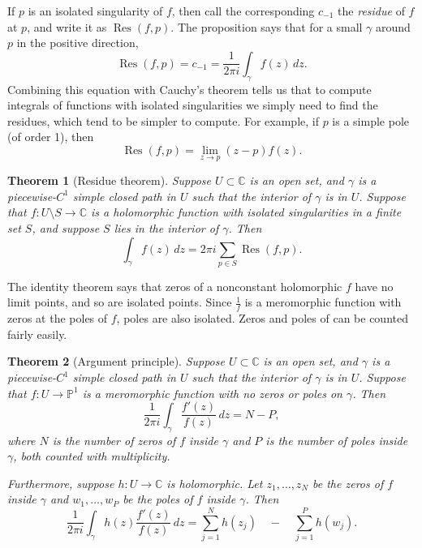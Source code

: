 \documentclass[12pt,openany]{book}
\newcommand{\C}{{\mathbb{C}}}
\newcommand{\bP}{{\mathbb{P}}}
\newcommand{\myindex}[1]{#1\index{#1}}
\theoremstyle{plain}
\newtheorem{thm}{Theorem}[section]
\theoremstyle{remark}
\theoremstyle{definition}
\theoremstyle{exercise}
\theoremstyle{example}
\begin{document}
\pagebreak[3]
If $p$ is an isolated singularity of $f$, then call the corresponding
$c_{-1}$ the \emph{\myindex{residue}} of $f$ at $p$, and write it
as $\operatorname{Res}(f,p)$.  
The proposition says that for a small $\gamma$ around $p$ in the positive direction,
\begin{equation*}
\operatorname{Res}(f,p) = c_{-1} = \frac{1}{2\pi i} \int_\gamma f(z) \, dz
.
\end{equation*}
Combining this equation with Cauchy's theorem tells us that to compute
integrals of functions with isolated singularities we simply need to find
the residues,
which tend to be simpler to
compute.  For example, if $p$ is a simple pole (of order 1), then 
\begin{equation*}
\operatorname{Res}(f,p) = \lim_{z \to p} (z-p)f(z) .
\end{equation*}

\begin{thm}[Residue theorem]\label{thm:residue}
Suppose $U \subset \C$ is an open set, and $\gamma$ is a piecewise-$C^1$
simple closed path in $U$ such that the interior of $\gamma$ is in $U$.
Suppose that $f \colon U \setminus S \to \C$ is a holomorphic function with isolated
singularities in a finite set $S$, and suppose $S$ lies in the interior of $\gamma$.
Then
\begin{equation*}
\int_{\gamma} f(z) \, dz = 2\pi i \sum_{p \in S} \operatorname{Res}(f,p) .
\end{equation*}
\end{thm}

The identity theorem says that zeros of a nonconstant holomorphic $f$
have no limit points, and so are isolated points.
Since $\frac{1}{f}$ is a meromorphic
function with zeros at the poles of $f$, poles are also
isolated.  Zeros and poles of  can be counted fairly easily.

\begin{thm}[Argument principle]\label{thm:onevarargprinc}
Suppose $U \subset \C$ is an open set, and $\gamma$ is a piecewise-$C^1$
simple closed path in $U$ such that the interior of $\gamma$ is in $U$.
Suppose that $f \colon U \to \bP^1$ is a meromorphic function with no zeros
or poles on $\gamma$.
Then
\begin{equation*}
\frac{1}{2\pi i}
\int_\gamma \frac{f'(z)}{f(z)} \, dz
= N - P ,
\end{equation*}
where $N$ is the number of zeros of $f$ inside $\gamma$ and $P$ is the
number of poles inside $\gamma$, both counted with multiplicity.

Furthermore, suppose $h \colon U \to \C$ is holomorphic.  
Let $z_1,\ldots,z_N$ be the zeros of $f$ inside $\gamma$ and
$w_1,\ldots,w_P$ be the poles of $f$ inside $\gamma$.
Then
\begin{equation*}
\frac{1}{2\pi i}
\int_\gamma h(z) \frac{f'(z)}{f(z)} \, dz
=
\sum_{j=1}^N h(z_j)
\quad
-
\quad
\sum_{j=1}^P h(w_j) .
\end{equation*}
\end{thm}
\end{document}
